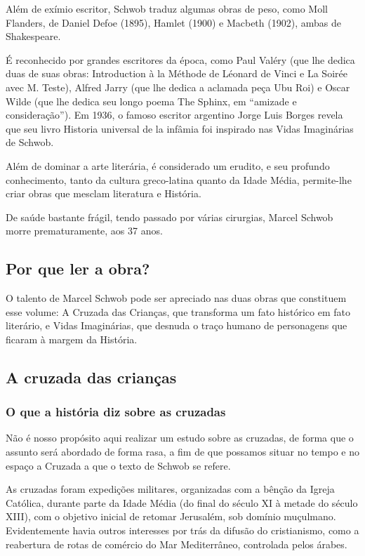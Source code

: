 \documentclass[12pt]{extarticle}
\begin{document}
Além de exímio escritor, Schwob traduz algumas obras de peso, como Moll
Flanders, de Daniel Defoe (1895), Hamlet (1900) e Macbeth (1902), ambas
de Shakespeare.

É reconhecido por grandes escritores da época, como Paul Valéry (que lhe
dedica duas de suas obras: Introduction à la Méthode de Léonard de Vinci
e La Soirée avec M. Teste), Alfred Jarry (que lhe dedica a aclamada peça
Ubu Roi) e Oscar Wilde (que lhe dedica seu longo poema The Sphinx, em
``amizade e consideração''). Em 1936, o famoso escritor argentino Jorge
Luis Borges revela que seu livro Historia universal de la infâmia foi
inspirado nas Vidas Imaginárias de Schwob.




Além de dominar a arte literária, é considerado um erudito, e seu
profundo conhecimento, tanto da cultura greco-latina quanto da Idade
Média, permite-lhe criar obras que mesclam literatura e História.

De saúde bastante frágil, tendo passado por várias cirurgias, Marcel
Schwob morre prematuramente, aos 37 anos.

\subsection{Por que ler a obra?}

O talento de Marcel Schwob pode ser apreciado nas duas obras que
constituem esse volume: A Cruzada das Crianças, que transforma um fato
histórico em fato literário, e Vidas Imaginárias, que desnuda o traço
humano de personagens que ficaram à margem da História.

\subsection{A cruzada das crianças}


\subsubsection{O que a história diz sobre as cruzadas}

Não é nosso propósito aqui realizar um estudo sobre as cruzadas, de
forma que o assunto será abordado de forma rasa, a fim de que possamos
situar no tempo e no espaço a Cruzada a que o texto de Schwob se refere.

As cruzadas foram expedições militares, organizadas com a bênção da
Igreja Católica, durante parte da Idade Média (do final do século XI à
metade do século XIII), com o objetivo inicial de retomar Jerusalém, sob
domínio muçulmano. Evidentemente havia outros interesses por trás da
difusão do cristianismo, como a reabertura de rotas de comércio do Mar
Mediterrâneo, controlada pelos árabes.
\end{document}
